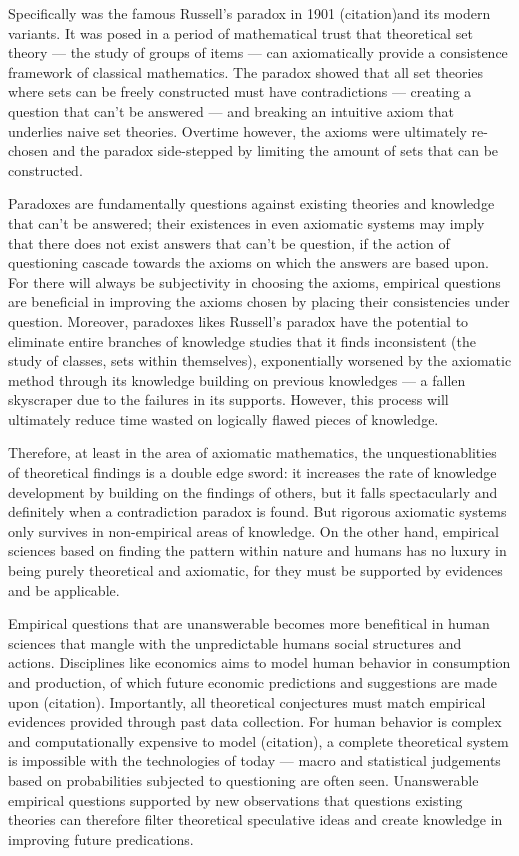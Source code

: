 \documentclass[a4paper,12pt]{article}
\begin{document}
Specifically was the famous Russell's paradox in 1901 (citation)and its modern variants. It was posed in a period of mathematical trust that theoretical set theory --- the study of groups of items --- can axiomatically provide a consistence framework of classical mathematics. The paradox showed that all set theories where sets can be freely constructed must have contradictions --- creating a question that can't be answered --- and breaking an intuitive axiom that underlies naive set theories. Overtime however, the axioms were ultimately re-chosen and the paradox side-stepped by limiting the amount of sets that can be constructed.

Paradoxes are fundamentally questions against existing theories and knowledge that can't be answered; their existences in even axiomatic systems may imply that there does not exist answers that can't be question, if the action of questioning cascade towards the axioms on which the answers are based upon. For there will always be subjectivity in choosing the axioms, empirical questions are beneficial in improving the axioms chosen by placing their consistencies under question. Moreover, paradoxes likes Russell's paradox have the potential to eliminate entire branches of knowledge studies that it finds inconsistent (the study of classes, sets within themselves), exponentially worsened by the axiomatic method through its knowledge building on previous knowledges --- a fallen skyscraper due to the failures in its supports. However, this process will ultimately reduce time wasted on logically flawed pieces of knowledge.

Therefore, at least in the area of axiomatic mathematics, the unquestionablities of theoretical findings is a double edge sword: it increases the rate of knowledge development by building on the findings of others, but it falls spectacularly and definitely when a contradiction paradox is found. But rigorous axiomatic systems only survives in non-empirical areas of knowledge. On the other hand, empirical sciences based on finding the pattern within nature and humans has no luxury in being purely theoretical and axiomatic, for they must be supported by evidences and be applicable.

Empirical questions that are unanswerable becomes more benefitical in human sciences that mangle with the unpredictable humans social structures and actions. Disciplines like economics aims to model human behavior in consumption and production, of which future economic predictions and suggestions are made upon (citation). Importantly, all theoretical conjectures must match empirical evidences provided through past data collection. For human behavior is complex and computationally expensive to model (citation), a complete theoretical system is impossible with the technologies of today --- macro and statistical judgements based on probabilities subjected to questioning are often seen. Unanswerable empirical questions supported by new observations that questions existing theories can therefore filter theoretical speculative ideas and create knowledge in improving future predications.
\end{document}
